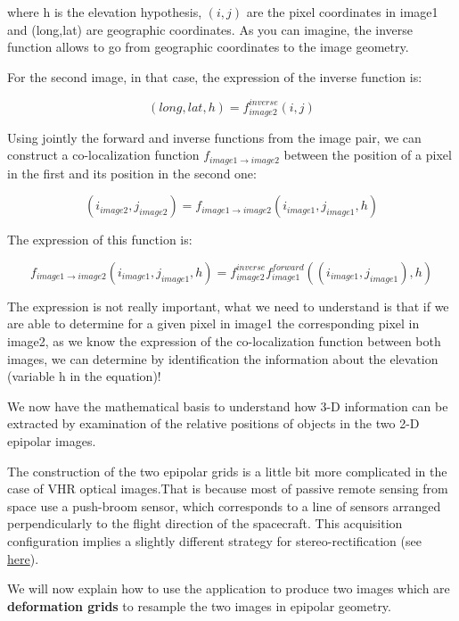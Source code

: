 where h is the elevation hypothesis, $(i,j)$ are the pixel coordinates in image1
and (long,lat) are geographic coordinates. As you can imagine, the inverse
function allows to go from geographic coordinates to the image geometry.

For the second image, in that case, the expression of the inverse function is:

\begin{equation}
   (long,lat,h) = f^{inverse}_{image2}(i,j)
\end{equation}

Using jointly the forward and inverse functions from the image pair, we can
construct a co-localization function $f_{image1 \rightarrow image2}$ between
the position of a pixel in the first and its position in the second one:

\begin{equation}
(i_{image2},j_{image2}) = f_{image1 \rightarrow image2} (i_{image1} , j_{image1} , h)
\end{equation}

The expression of this function is:

\begin{equation}
f_{image1 \rightarrow image2} (i_{image1} , j_{image1} , h) =  f^{inverse}_{image2} f^{forward}_{image1}((i_{image1} , j_{image1}), h)
\end{equation}

The expression is not really important, what we need to understand is that if we
are able to determine for a given pixel in image1 the corresponding pixel in
image2, as we know the expression of the co-localization function between
both images, we can determine by identification the information about the
elevation (variable h in the equation)!

We now have the mathematical basis to understand how 3-D information can be
extracted by examination of the relative positions of objects in the two 2-D
epipolar images.

The construction of the two epipolar grids is a little bit more complicated in
the case of VHR optical images.That is because most of passive remote sensing from
space use a push-broom sensor, which corresponds to a line of sensors arranged
perpendicularly to the flight direction of the spacecraft. This acquisition
configuration implies a slightly different strategy for stereo-rectification
(see
\href{http://en.wikipedia.org/wiki/Epipolar_geometry#Epipolar_geometry_of_pushbroom_sensor}{here}).

We will now explain how to use the 
application to produce two images which are \textbf{deformation grids} to resample
the two images in epipolar geometry.

